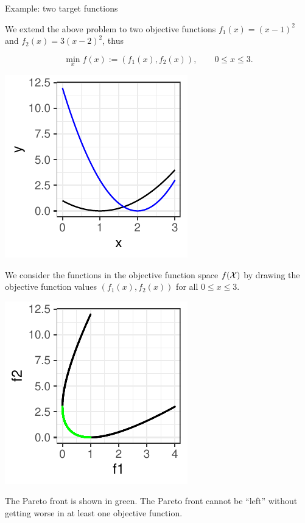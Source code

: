 \begin{frame}[allowframebreaks]{Example: two target functions}

We extend the above problem to two objective functions $f_1(x) = (x - 1)^2$ and $f_2(x) = 3(x - 2)^2$, thus

$$
\min_x f(x) := \left(f_1(x), f_2(x)\right), \qquad 0 \le x \le 3.
$$

\vspace*{0.1cm}


\centering \includegraphics[width=0.5\linewidth,height=0.5\textheight]{images/expedia-7-1}


\framebreak

We consider the functions in the objective function space $f(\mathcal{X})$ by drawing the objective function values $\left(f_1(x), f_2(x)\right)$ for all $0 \le x \le 3$.

\vspace*{0.1cm}


\centering \includegraphics[width=0.5\linewidth,height=0.5\textheight]{images/expedia-8-1}

    \vspace*{-0.3cm}

The Pareto front is shown in green.
The Pareto front cannot be \enquote{left} without getting worse in at least one objective function.

\end{frame}


